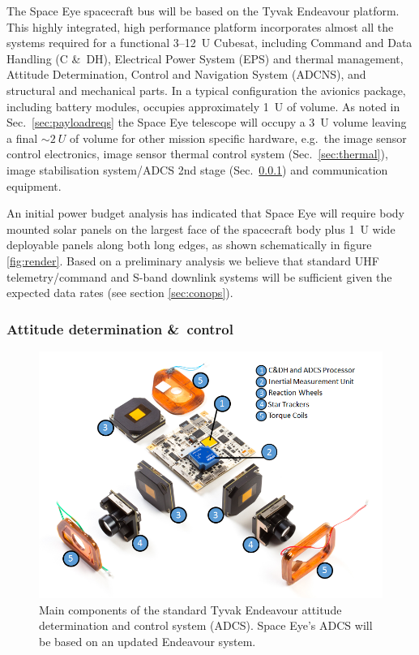 \documentclass[]{iac}
\begin{document}
The Space Eye spacecraft bus will be based on the Tyvak Endeavour platform. This highly integrated, high performance
platform incorporates almost all the systems required for a functional 3--\SI{12}{U} Cubesat, including Command and Data
Handling (C \&\ DH),  Electrical Power System (EPS) and thermal management, Attitude Determination, Control and
Navigation System (ADCNS), and structural and mechanical parts.  In a typical configuration the avionics package,
including battery modules, occupies approximately \SI{1}{U} of volume.  As noted in Sec.~\ref{sec:payloadreqs} the Space
Eye telescope will occupy a \SI{3}{U} volume leaving a final $\sim\SI{2}{U}$ of volume for other mission specific
hardware, e.g.\ the image sensor control electronics, image sensor thermal control system (Sec.~\ref{sec:thermal}),
image stabilisation system/ADCS 2nd stage (Sec.~\ref{sec:adcs}) and communication equipment.

An initial power budget analysis has indicated that Space Eye will require body mounted solar panels on the largest face
of the spacecraft body plus \SI{1}{U} wide deployable panels along both long edges, as shown schematically in figure
\ref{fig:render}. Based on a preliminary analysis we believe that standard UHF telemetry/command and S-band downlink
systems will be sufficient given the expected data rates (see section \ref{sec:conops})\cite{Reisenfeld2015}.

\subsubsection{Attitude determination \&\ control}
\label{sec:adcs}

\begin{figure}[tp]
  \center \includegraphics[width=\columnwidth]{figures/adcs.png}
  \caption{\label{fig:adcs}Main components of the standard Tyvak Endeavour attitude determination and control system
    (ADCS). Space Eye's ADCS will be based on an updated Endeavour system.}
\end{figure}
\end{document}
